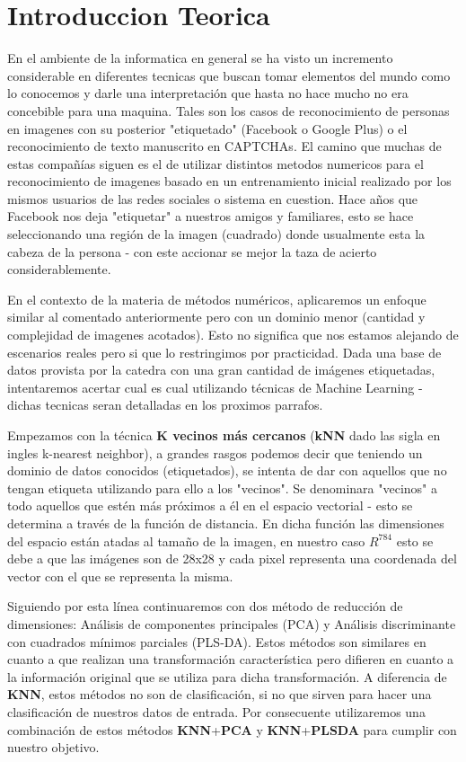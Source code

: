 \section{Introduccion Teorica}
En el ambiente de la informatica en general se ha visto un incremento considerable en diferentes tecnicas que buscan tomar elementos del mundo como lo conocemos y darle una interpretación que hasta no hace mucho no era concebible para una maquina. Tales son los casos de reconocimiento de personas en imagenes con su posterior "etiquetado" (Facebook o Google Plus) o el reconocimiento de texto manuscrito en CAPTCHAs.
El camino que muchas de estas compañías siguen es el de utilizar distintos metodos numericos para el reconocimiento de imagenes basado en un entrenamiento inicial realizado por los mismos usuarios de las redes sociales o sistema en cuestion. Hace años que Facebook nos deja "etiquetar" a nuestros amigos y familiares, esto se hace seleccionando una región de la imagen (cuadrado) donde usualmente esta la cabeza de la persona - con este accionar se mejor la taza de acierto considerablemente.

En el contexto de la materia de métodos numéricos, aplicaremos un enfoque similar al comentado anteriormente pero con un dominio menor (cantidad y complejidad de imagenes acotados). Esto no significa que nos estamos alejando de escenarios reales pero si que lo restringimos por practicidad.
Dada una base de datos provista por la catedra con una gran cantidad de imágenes etiquetadas, intentaremos acertar cual es cual utilizando técnicas de Machine Learning - dichas tecnicas seran detalladas en los proximos parrafos.

Empezamos con la técnica \textbf{K vecinos más cercanos} (\textbf{kNN} dado las sigla en ingles k-nearest neighbor), a grandes rasgos podemos decir que teniendo un dominio de datos conocidos (etiquetados), se intenta de dar con aquellos que no tengan etiqueta utilizando para ello a los "vecinos". Se denominara "vecinos" a todo aquellos que estén más próximos a él en el espacio vectorial - esto se determina a través de la función de distancia. En dicha función las dimensiones del espacio están atadas al tamaño de la imagen, en nuestro caso $R^{784}$ esto se debe a que las imágenes son de 28x28 y cada pixel representa una coordenada del vector con el que se representa la misma.

Siguiendo por esta línea continuaremos con dos método de reducción de dimensiones: Análisis de componentes principales (PCA) y Análisis discriminante con cuadrados mínimos parciales (PLS-DA). Estos métodos son similares en cuanto a que realizan una transformación característica pero difieren en cuanto a la información original que se utiliza para dicha transformación. 
A diferencia de \textbf{KNN}, estos métodos no son de clasificación, si no que sirven para hacer una clasificación de nuestros datos de entrada. Por consecuente utilizaremos una combinación de estos métodos \textbf{KNN}+\textbf{PCA} y \textbf{KNN}+\textbf{PLSDA} para cumplir con nuestro objetivo.

